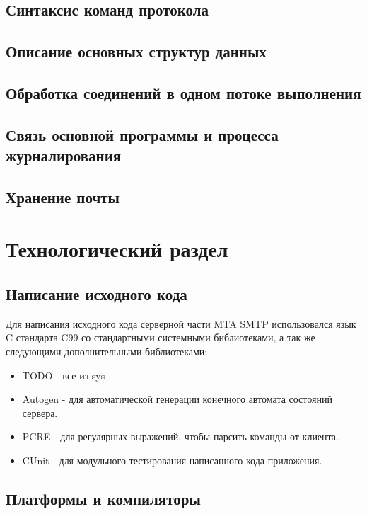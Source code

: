 \documentclass[a4paper,12pt]{report}
\begin{document}
\section{Синтаксис команд протокола}

\section{Описание основных структур данных}

\section{Обработка соединений в одном потоке выполнения}

\section{Связь основной программы и процесса журналирования}

\section{Хранение почты}

\chapter{Технологический раздел}

\section{Написание исходного кода}

Для написания исходного кода серверной части MTA SMTP использовался язык C стандарта C99 со стандартными системными библиотеками, а так же следующими дополнительными библиотеками:
\begin{itemize}
    \item TODO - все из sys 
    \item Autogen - для автоматической генерации конечного автомата состояний сервера.
    \item PCRE - для регулярных выражений, чтобы парсить команды от клиента.
    \item CUnit - для модульного тестирования написанного кода приложения.
\end{itemize}


\section{Платформы и компиляторы}
\end{document}
